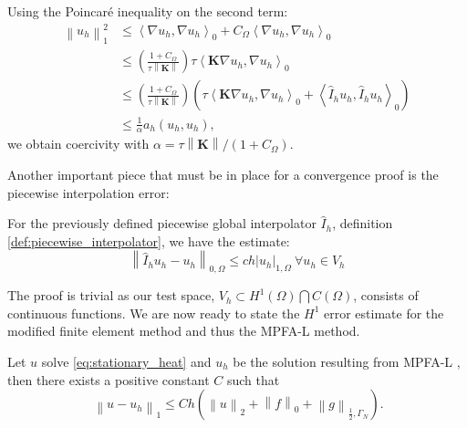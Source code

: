 \documentclass[../Main/main.tex]{subfiles}
\begin{document}
		Using the Poincaré inequality on the second term:
		\begin{equation}
		\begin{aligned} 
		\left \| u_h \right \|_1^2	&\leq \left \langle \nabla u_h,\nabla u_h \right \rangle_0 + C_{\Omega} \left \langle \nabla u_h, \nabla u_h \right \rangle_0 \\
			&\leq \left(\frac{1+C_{\Omega}}{\tau \left \|\bm{K}\right \|} \right) \tau \left  \langle  \bm{K} \nabla  u_h, \nabla u_h \right \rangle_0  \\
			&\leq \left(\frac{1+C_{\Omega}}{\tau \left \|\bm{K}\right \|} \right) \left(\tau \left  \langle  \bm{K} \nabla  u_h, \nabla u_h \right \rangle_0 + \left \langle \hat{I}_h u_h,\hat{I}_h u_h \right \rangle_0\right)\\
			&\leq \frac{1}{\alpha} a_h(u_h,u_h), 
		\end{aligned}
	\end{equation} 
	we obtain coercivity with $\alpha = \tau \left \|\bm{K}\right \|/(1+C_{\Omega})$.\par
	Another important piece that must be in place for a convergence proof is the piecewise interpolation error:
	\begin{lemma}\label{lemma:int_error}
		For the previously defined piecewise global interpolator $\hat{I}_h$, definition \ref{def:piecewise_interpolator}, we have the estimate:
		\begin{equation}
			\left \| \hat{I}_h u_h - u_h \right \|_{0,\Omega} \leq c h | u_h |_{1,\Omega} \ \forall u_h \in V_h
		\end{equation}
	\end{lemma}
The proof is trivial as our test space, $V_h \subset H^1(\Omega)\bigcap C(\Omega)$, consists of continuous functions.
	We are now ready to state the $H^1$ error estimate for the modified finite element method and thus the MPFA-L method.
	\begin{theorem}\label{th:convergence of elliptic}
		Let $u$ solve \eqref{eq:stationary_heat} and $u_h$ be the solution resulting from MPFA-L , then there exists a positive constant $C$ such that
		\begin{equation}\
			\left \|u - u_h \right \|_1 \leq C h (\left \| u \right \|_2 + \left \| f \right \|_0 + \left \| g \right \|_{\frac{1}{2},\Gamma_N}).
		\end{equation}
	\end{theorem}
\end{document}
